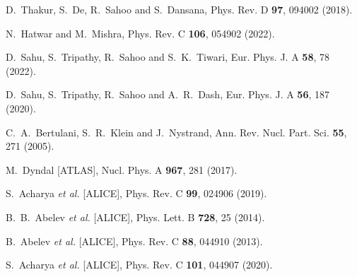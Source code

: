 \documentclass[aps,twocolumn,nofootinbib]{revtex4-1}
\begin{document}
\begin{thebibliography}{}
D.~Thakur, S.~De, R.~Sahoo and S.~Dansana,
Phys. Rev. D \textbf{97}, 094002 (2018).

N.~Hatwar and M.~Mishra,
Phys. Rev. C \textbf{106}, 054902 (2022).

D.~Sahu, S.~Tripathy, R.~Sahoo and S.~K.~Tiwari,
Eur. Phys. J. A \textbf{58}, 78 (2022).

D.~Sahu, S.~Tripathy, R.~Sahoo and A.~R.~Dash,
Eur. Phys. J. A \textbf{56}, 187 (2020).

C.~A.~Bertulani, S.~R.~Klein and J.~Nystrand,
Ann. Rev. Nucl. Part. Sci. \textbf{55}, 271 (2005).

M.~Dyndal [ATLAS],
Nucl. Phys. A \textbf{967}, 281 (2017).

S.~Acharya \textit{et al.} [ALICE],
Phys. Rev. C \textbf{99}, 024906 (2019).

B.~B.~Abelev \textit{et al.} [ALICE],
Phys. Lett. B \textbf{728}, 25 (2014).

B.~Abelev \textit{et al.} [ALICE],
Phys. Rev. C \textbf{88}, 044910 (2013).

S.~Acharya \textit{et al.} [ALICE],
Phys. Rev. C \textbf{101}, 044907 (2020).
\end{thebibliography}
 
\end{document}
